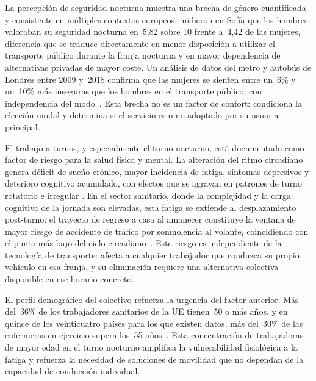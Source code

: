 La percepción de seguridad nocturna muestra una brecha de 
género cuantificada y consistente en múltiples contextos 
europeos. \textcite{PlyushetvaBoussauw2020} midieron en Sofía 
que los hombres valoraban su seguridad nocturna en~5,82 sobre 
10 frente a~4,42 de las mujeres, diferencia que se traduce 
directamente en menor disposición a utilizar el transporte 
público durante la franja nocturna y en mayor dependencia de 
alternativas privadas de mayor coste. Un análisis de datos 
del metro y autobús de Londres entre 2009 y~2018 confirma 
que las mujeres se sienten entre un~6\% y un~10\% más 
inseguras que los hombres en el transporte público, con 
independencia del 
modo~\parencite{AitBihiOuali2020}. Esta brecha no es un 
factor de confort: condiciona la elección modal y determina 
si el servicio es o no adoptado por su usuaria principal.

El trabajo a turnos, y especialmente el turno nocturno, está 
documentado como factor de riesgo para la salud física y 
mental. La alteración del ritmo circadiano genera déficit 
de sueño crónico, mayor incidencia de fatiga, síntomas 
depresivos y deterioro cognitivo acumulado, con efectos 
que se agravan en patrones de turno rotatorio e irregular 
\parencite{SanchezSellero2025}. En el sector sanitario, 
donde la complejidad y la carga cognitiva de la jornada 
son elevadas, esta fatiga se extiende al desplazamiento 
post-turno: el trayecto de regreso a casa al amanecer 
constituye la ventana de mayor riesgo de accidente de 
tráfico por somnolencia al volante, coincidiendo con el 
punto más bajo del ciclo circadiano~\parencite{Eurofound2020Sectors}. 
Este riesgo es independiente de la tecnología de transporte: 
afecta a cualquier trabajador que conduzca su propio vehículo 
en esa franja, y su eliminación requiere una alternativa 
colectiva disponible en ese horario concreto.

El perfil demográfico del colectivo refuerza la urgencia del 
factor anterior. Más del~36\% de los trabajadores sanitarios 
de la UE tienen~50 o más años, y en quince de los 
veinticuatro países para los que existen datos, más del~30\% 
de las enfermeras en ejercicio supera los~55 
años~\parencite{Eurostat2022health}. Esta concentración de 
trabajadoras de mayor edad en el turno nocturno amplifica 
la vulnerabilidad fisiológica a la fatiga y refuerza la 
necesidad de soluciones de movilidad que no dependan de la 
capacidad de conducción individual.



